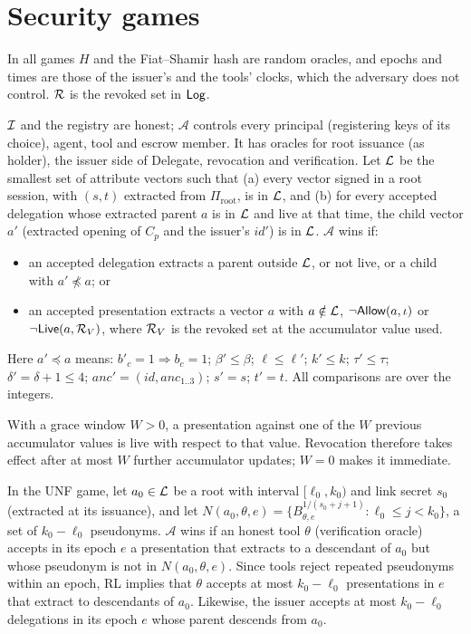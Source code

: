 \section{Security games}\label{s:defs}
In all games $H$ and the Fiat--Shamir hash are random oracles, and epochs and times are those of the issuer's and the tools' clocks, which the adversary does not control. $\mathcal{R}$ is the revoked set in $\mathsf{Log}$.

\begin{definition}[UNF]\label{def:unf}
$\mathcal{I}$ and the registry are honest; $\mathcal{A}$ controls every principal (registering keys of its choice), agent, tool and escrow member. It has oracles for root issuance (as holder), the issuer side of Delegate, revocation and verification. Let $\mathcal{L}$ be the smallest set of attribute vectors such that (a) every vector signed in a root session, with $(s,t)$ extracted from $\Pi_{\mathrm{root}}$, is in $\mathcal{L}$, and (b) for every accepted delegation whose extracted parent $a$ is in $\mathcal{L}$ and live at that time, the child vector $a'$ (extracted opening of $C_p$ and the issuer's $\mathit{id}'$) is in $\mathcal{L}$. $\mathcal{A}$ wins if:
\begin{itemize}[leftmargin=*]
\item an accepted delegation extracts a parent outside $\mathcal{L}$, or not live, or a child with $a'\not\preceq a$; or
\item an accepted presentation extracts a vector $a$ with $a\notin\mathcal{L}$, $\neg\mathsf{Allow}(a,\iota)$ or $\neg\mathsf{Live}(a,\mathcal{R}_V)$, where $\mathcal{R}_V$ is the revoked set at the accumulator value used.
\end{itemize}
Here $a'\preceq a$ means: $b'_c=1\Rightarrow b_c=1$; $\beta'\le\beta$; $\ell\le\ell'$; $k'\le k$; $\tau'\le\tau$; $\delta'=\delta+1\le4$; $\mathit{anc}'=(\mathit{id},\mathit{anc}_{1..3})$; $s'=s$; $t'=t$. All comparisons are over the integers.
\end{definition}
With a grace window $W>0$, a presentation against one of the $W$ previous accumulator values is live with respect to that value. Revocation therefore takes effect after at most $W$ further accumulator updates; $W=0$ makes it immediate.

\begin{definition}[RL]\label{def:rl}
In the UNF game, let $a_0\in\mathcal{L}$ be a root with interval $[\ell_0,k_0)$ and link secret $s_0$ (extracted at its issuance), and let $N(a_0,\theta,e)=\{B_{\theta,e}^{1/(s_0+j+1)}:\ell_0\le j<k_0\}$, a set of $k_0-\ell_0$ pseudonyms. $\mathcal{A}$ wins if an honest tool $\theta$ (verification oracle) accepts in its epoch $e$ a presentation that extracts to a descendant of $a_0$ but whose pseudonym is not in $N(a_0,\theta,e)$. Since tools reject repeated pseudonyms within an epoch, RL implies that $\theta$ accepts at most $k_0-\ell_0$ presentations in $e$ that extract to descendants of $a_0$. Likewise, the issuer accepts at most $k_0-\ell_0$ delegations in its epoch $e$ whose parent descends from $a_0$.
\end{definition}

